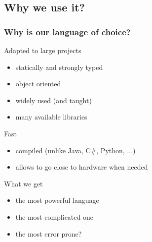 \subsection[Use]{Why we use it?}

\begin{frame}
  \frametitle{Why is \cpp{} our language of choice?}
  \begin{block}{Adapted to large projects}
    \begin{itemize}
    \item statically and strongly typed
    \item object oriented
    \item widely used (and taught)
    \item many available libraries
    \end{itemize}
  \end{block}
  \pause
  \begin{block}{Fast}
    \begin{itemize}
    \item compiled (unlike Java, C\#, Python, ...)
    \item allows to go close to hardware when needed
    \end{itemize}
  \end{block}
  \pause
  \begin{alertblock}{What we get}
    \begin{itemize}
    \item the most powerful language
    \item the most complicated one
    \item the most error prone?
    \end{itemize}
  \end{alertblock}
\end{frame}
